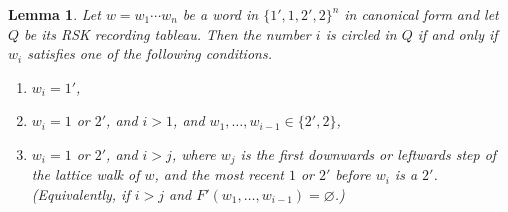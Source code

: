 \documentclass[10pt]{amsart}
\newtheorem{lemma}[theorem]{Lemma}
\theoremstyle{definition}
\begin{document}
\begin{lemma}\label{lem:circling}
Let $w=w_1\cdots w_n$ be a word in $\{1',1,2',2\}^n$ in canonical form and let $Q$ be its RSK recording tableau. Then the number $i$ is circled in $Q$ if and only if $w_i$ satisfies one of the following conditions.
\begin{enumerate}[label={(\roman*)}]
\item\label{condition1} $w_i=1'$,
\item\label{condition2} $w_i=1$ or $2'$, and $i>1$, and $w_1, \ldots, w_{i-1} \in \{2',2\}$,
\item\label{condition4} $w_i=1$ or $2'$, and $i > j$, where $w_j$ is the first downwards or leftwards step of the lattice walk of $w$, and the most recent $1$ or $2'$ before $w_i$ is a $2'$. \textup{(}Equivalently, if $i > j$ and $F'(w_1, \ldots, w_{i-1}) = \varnothing$.\textup{)}
\end{enumerate}
\end{lemma}
\end{document}
